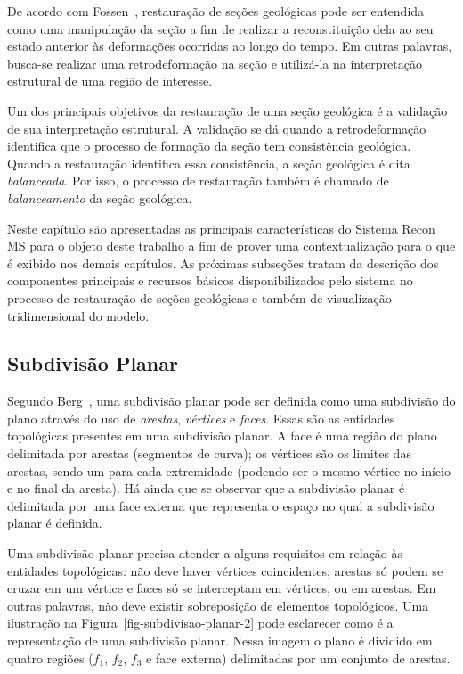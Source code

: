 De acordo com Fossen~\cite{Fossen}, restauração de seções geológicas pode ser entendida como uma manipulação da seção a fim de realizar a reconstituição dela ao seu estado anterior às deformações ocorridas ao longo do tempo. Em outras palavras, busca-se realizar uma retrodeformação na seção e utilizá-la na interpretação estrutural de uma região de interesse.

Um dos principais objetivos da restauração de uma seção geológica é a validação de sua interpretação estrutural. A validação se dá quando a retrodeformação identifica que o processo de formação da seção tem consistência geológica. Quando a restauração identifica essa consistência, a seção geológica é dita \emph{balanceada}. Por isso, o processo de restauração também é chamado de \emph{balanceamento} da seção geológica.

Neste capítulo são apresentadas as principais características do Sistema Recon MS para o objeto deste trabalho a fim de prover uma contextualização para o que é exibido nos demais capítulos. As próximas subseções tratam da descrição dos componentes principais e recursos básicos disponibilizados pelo sistema no processo de restauração de seções geológicas e também de visualização tridimensional do modelo. 

\subsection{Subdivisão Planar} %

Segundo Berg~\cite{Berg}, uma subdivisão planar pode ser definida como uma subdivisão do plano através do uso de \textit{arestas}, \textit{vértices} e \textit{faces}. Essas são as entidades topológicas presentes em uma subdivisão planar. A face é uma região do plano delimitada por arestas (segmentos de curva); os vértices são os limites das arestas, sendo um para cada extremidade (podendo ser o mesmo vértice no início e no final da aresta). Há ainda que se observar que a subdivisão planar é delimitada por uma face externa que representa o espaço no qual a subdivisão planar é definida.

Uma subdivisão planar precisa atender a alguns requisitos em relação às entidades topológicas: não deve haver vértices coincidentes; arestas só podem se cruzar em um vértice e faces só se interceptam em vértices, ou em arestas. Em outras palavras, não deve existir sobreposição de elementos topológicos. Uma ilustração na Figura~\ref{fig-subdivisao-planar-2} pode esclarecer como é a representação de uma subdivisão planar. Nessa imagem o plano é dividido em quatro regiões ($f_1$, $f_2$, $f_3$ e face externa) delimitadas por um conjunto de arestas.

